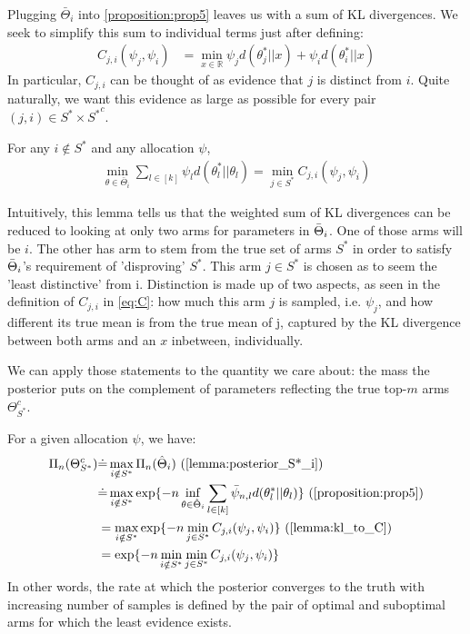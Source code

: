 Plugging $\bar{\Theta}_i$ into \ref{proposition:prop5} leaves us with a sum of KL divergences. We seek to simplify this sum to individual terms just after defining:
\begin{align}
  C_{j, i}(\psi_j,\psi_i) &=  \min_{x \in \mathbb{R}} \psi_j d(\theta^*_{j} || x) + \psi_i d(\theta_{i}^* ||x) \label{eq:C}
\end{align}
In particular, $C_{j, i}$ can be thought of as evidence that $j$ is distinct from $i$. Quite naturally, we want this evidence as large as possible for every pair $(j, i) \in S^* \times {S^*}^c$.

\begin{lemma}\label{lemma:kl_to_C}
  For any $i \notin S^*$ and any allocation $\psi$,
  \begin{align}
    \min_{\theta \in \bar{\Theta}_i} \sum_{l \in [k]}\psi_l d(\theta^*_l||\theta_l) = \min_{j \in S^*} C_{j, i}(\psi_j, \psi_i)
  \end{align}
\end{lemma}

Intuitively, this lemma tells us that the weighted sum of KL divergences can be reduced to looking at only two arms for parameters in $\Bar{\Theta}_i$. One of those arms will be $i$. The other has arm to stem from the true set of arms $S^*$ in order to satisfy $\Bar{\Theta}_i$'s requirement of 'disproving' $S^*$. This arm $j \in S^*$ is chosen as to seem the 'least distinctive' from i. Distinction is made up of two aspects, as seen in the definition of $C_{j, i}$ in \eqref{eq:C}: how much this arm $j$ is sampled, i.e. $\psi_j$, and how different its true mean is from the true mean of j, captured by the KL divergence between both arms and an $x$ inbetween, individually.

We can apply those statements to the quantity we care about: the mass the posterior puts on the complement of parameters reflecting the true top-$m$ arms $\Theta_{S^*}^c$.

For a given allocation $\psi$, we have:
\begin{align}
  \Pi_n(\Theta_{S^*}^c) &\deq \max_{i \notin S^*}\Pi_n(\hat{\Theta}_i) \text{ (\Cref{lemma:posterior_S*_i})}\\
    &\deq \max_{i \notin S^*} \exp\{-n\inf_{\theta \in \hat{\Theta}_i} \sum_{l \in [k]} \bar{\psi}_{n, l} d(\theta^*_l || \theta_l)\} \text{ (\Cref{proposition:prop5})} \\
    &= \max_{i \notin S^*} \exp\{-n \min_{j \in S^*} C_{j, i}(\psi_j, \psi_i)\} \text{ (\Cref{lemma:kl_to_C})} \\
    &= \exp\{-n \min_{i \notin S^*}\min_{j \in S^*} C_{j, i}(\psi_j, \psi_i)\} \label{eq:posterior}
\end{align}
In other words, the rate at which the posterior converges to the truth with increasing number of samples is defined by the pair of optimal and suboptimal arms for which the least evidence exists.

